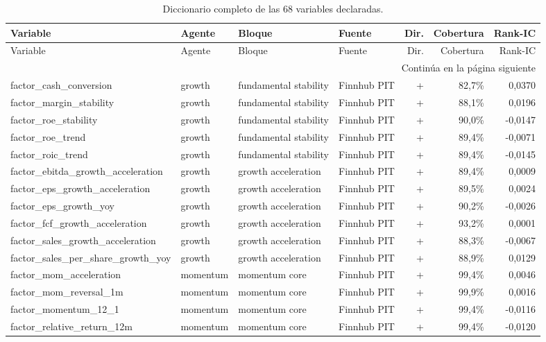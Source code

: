 \begin{longtable}{p{4.0cm}p{1.7cm}p{3.0cm}p{2.0cm}rrr}
\caption{Diccionario completo de las 68 variables declaradas.}\label{tab:diccionario-features}\\
\toprule
Variable & Agente & Bloque & Fuente & Dir. & Cobertura & Rank-IC \\
\midrule
\endfirsthead
\toprule
Variable & Agente & Bloque & Fuente & Dir. & Cobertura & Rank-IC \\
\midrule
\endhead
\midrule
\multicolumn{7}{r}{\footnotesize Continúa en la página siguiente}\\
\endfoot
\bottomrule
\endlastfoot
factor\_cash\_conversion & growth & fundamental stability & Finnhub PIT & + & 82,7\% & 0,0370 \\
factor\_margin\_stability & growth & fundamental stability & Finnhub PIT & + & 88,1\% & 0,0196 \\
factor\_roe\_stability & growth & fundamental stability & Finnhub PIT & + & 90,0\% & -0,0147 \\
factor\_roe\_trend & growth & fundamental stability & Finnhub PIT & + & 89,4\% & -0,0071 \\
factor\_roic\_trend & growth & fundamental stability & Finnhub PIT & + & 89,4\% & -0,0145 \\
factor\_ebitda\_growth\_acceleration & growth & growth acceleration & Finnhub PIT & + & 89,4\% & 0,0009 \\
factor\_eps\_growth\_acceleration & growth & growth acceleration & Finnhub PIT & + & 89,5\% & 0,0024 \\
factor\_eps\_growth\_yoy & growth & growth acceleration & Finnhub PIT & + & 90,2\% & -0,0026 \\
factor\_fcf\_growth\_acceleration & growth & growth acceleration & Finnhub PIT & + & 93,2\% & 0,0001 \\
factor\_sales\_growth\_acceleration & growth & growth acceleration & Finnhub PIT & + & 88,3\% & -0,0067 \\
factor\_sales\_per\_share\_growth\_yoy & growth & growth acceleration & Finnhub PIT & + & 88,9\% & 0,0129 \\
factor\_mom\_acceleration & momentum & momentum core & Finnhub PIT & + & 99,4\% & 0,0046 \\
factor\_mom\_reversal\_1m & momentum & momentum core & Finnhub PIT & + & 99,9\% & 0,0016 \\
factor\_momentum\_12\_1 & momentum & momentum core & Finnhub PIT & + & 99,4\% & -0,0116 \\
factor\_relative\_return\_12m & momentum & momentum core & Finnhub PIT & + & 99,4\% & -0,0120 \\

\end{longtable}
